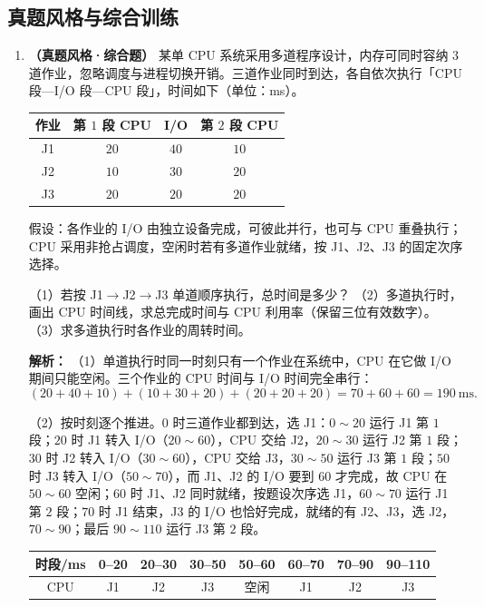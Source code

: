 \subsection{真题风格与综合训练}

\begin{enumerate}[resume]

\item \textbf{（真题风格·综合题）} 某单 CPU 系统采用多道程序设计，内存可同时容纳 $3$ 道作业，忽略调度与进程切换开销。三道作业同时到达，各自依次执行「CPU 段—I/O 段—CPU 段」，时间如下（单位：ms）。

\begin{center}
\begin{tabular}{|c|c|c|c|}
\hline
作业 & 第 $1$ 段 CPU & I/O & 第 $2$ 段 CPU \\
\hline
J1 & $20$ & $40$ & $10$ \\
J2 & $10$ & $30$ & $20$ \\
J3 & $20$ & $20$ & $20$ \\
\hline
\end{tabular}
\end{center}

假设：各作业的 I/O 由独立设备完成，可彼此并行，也可与 CPU 重叠执行；CPU 采用非抢占调度，空闲时若有多道作业就绪，按 J1、J2、J3 的固定次序选择。

（1）若按 J1$\to$J2$\to$J3 单道顺序执行，总时间是多少？
（2）多道执行时，画出 CPU 时间线，求总完成时间与 CPU 利用率（保留三位有效数字）。
（3）求多道执行时各作业的周转时间。

\ifshowsolutions\par\noindent\textbf{解析：}
（1）单道执行时同一时刻只有一个作业在系统中，CPU 在它做 I/O 期间只能空闲。三个作业的 CPU 时间与 I/O 时间完全串行：
\[
(20+40+10)+(10+30+20)+(20+20+20)=70+60+60=190\ \text{ms}.
\]

（2）按时刻逐个推进。$0$ 时三道作业都到达，选 J1：$0\sim20$ 运行 J1 第 $1$ 段；$20$ 时 J1 转入 I/O（$20\sim60$），CPU 交给 J2，$20\sim30$ 运行 J2 第 $1$ 段；$30$ 时 J2 转入 I/O（$30\sim60$），CPU 交给 J3，$30\sim50$ 运行 J3 第 $1$ 段；$50$ 时 J3 转入 I/O（$50\sim70$），而 J1、J2 的 I/O 要到 $60$ 才完成，故 CPU 在 $50\sim60$ 空闲；$60$ 时 J1、J2 同时就绪，按题设次序选 J1，$60\sim70$ 运行 J1 第 $2$ 段；$70$ 时 J1 结束，J3 的 I/O 也恰好完成，就绪的有 J2、J3，选 J2，$70\sim90$；最后 $90\sim110$ 运行 J3 第 $2$ 段。

\begin{center}
{\small
\setlength{\tabcolsep}{4pt}%
\begin{tabular}{|c|c|c|c|c|c|c|c|}
\hline
时段/ms & 0--20 & 20--30 & 30--50 & 50--60 & 60--70 & 70--90 & 90--110 \\
\hline
CPU & J1 & J2 & J3 & 空闲 & J1 & J2 & J3 \\
\hline
\end{tabular}}
\end{center}


\end{enumerate}
